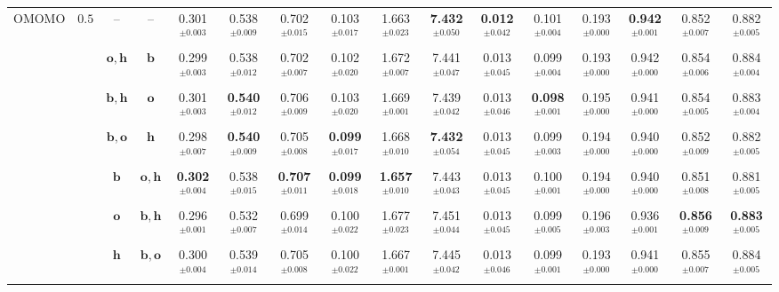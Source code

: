 \begin{table}
{\begin{tabular}{@{}cccccccccccccccc@{}}
        \multirow{7}{*}{OMOMO} & \multirow{7}{*}{$0.5$} & -- & -- &
        0.301$^{\pm0.003}$ & 0.538$^{\pm0.009}$ & 0.702$^{\pm0.015}$ & 0.103$^{\pm0.017}$ & 1.663$^{\pm0.023}$ & \textbf{7.432}$^{\pm0.050}$ & \textbf{0.012$^{\pm0.042}$} & 0.101$^{\pm0.004}$ & 0.193$^{\pm0.000}$ & \textbf{0.942$^{\pm0.001}$} & 0.852$^{\pm0.007}$ & 0.882$^{\pm0.005}$ \\
        & & $\boldsymbol{o}, \boldsymbol{h}$ & $\boldsymbol{b}$
        & 0.299$^{\pm0.003}$ & 0.538$^{\pm0.012}$ & 0.702$^{\pm0.007}$ & {0.102$^{\pm0.020}$} & 1.672$^{\pm0.007}$ & 7.441$^{\pm0.047}$ & 0.013$^{\pm0.045}$ & 0.099$^{\pm0.004}$ & 0.193$^{\pm0.000}$ & 0.942$^{\pm0.000}$ & 0.854$^{\pm0.006}$ & 0.884$^{\pm0.004}$ \\
        & & $\boldsymbol{b}, \boldsymbol{h}$ & $\boldsymbol{o}$
        & 0.301$^{\pm0.003}$ & \textbf{0.540$^{\pm0.012}$} & 0.706$^{\pm0.009}$ & 0.103$^{\pm0.020}$ & 1.669$^{\pm0.001}$ & 7.439$^{\pm0.042}$ & 0.013$^{\pm0.046}$ & \textbf{0.098$^{\pm0.001}$} & 0.195$^{\pm0.000}$ & 0.941$^{\pm0.000}$ & 0.854$^{\pm0.005}$ & 0.883$^{\pm0.004}$ \\
        & & $\boldsymbol{b}, \boldsymbol{o}$ & $\boldsymbol{h}$
        & 0.298$^{\pm0.007}$ & \textbf{0.540$^{\pm0.009}$} & 0.705$^{\pm0.008}$ & \textbf{0.099$^{\pm0.017}$} & 1.668$^{\pm0.010}$ & \textbf{7.432}$^{\pm0.054}$ & 0.013$^{\pm0.045}$ & 0.099$^{\pm0.003}$ & 0.194$^{\pm0.000}$ & 0.940$^{\pm0.000}$ & 0.852$^{\pm0.009}$ & 0.882$^{\pm0.005}$\\
        & & $\boldsymbol{b}$ & $\boldsymbol{o}, \boldsymbol{h}$
        & \textbf{0.302$^{\pm0.004}$} & 0.538$^{\pm0.015}$ & \textbf{0.707$^{\pm0.011}$} & \textbf{0.099$^{\pm0.018}$} & \textbf{1.657$^{\pm0.010}$} & 7.443$^{\pm0.043}$ & 0.013$^{\pm0.045}$ & 0.100$^{\pm0.001}$ & 0.194$^{\pm0.000}$ & 0.940$^{\pm0.000}$ & 0.851$^{\pm0.008}$ & 0.881$^{\pm0.005}$ \\
        & & $\boldsymbol{o}$ & $\boldsymbol{b}, \boldsymbol{h}$
        & 0.296$^{\pm0.001}$ & 0.532$^{\pm0.007}$ & 0.699$^{\pm0.014}$ & 0.100$^{\pm0.022}$ & 1.677$^{\pm0.023}$ & 7.451$^{\pm0.044}$ & 0.013$^{\pm0.045}$ & 0.099$^{\pm0.005}$ & {0.196$^{\pm0.003}$} & 0.936$^{\pm0.001}$ & \textbf{0.856$^{\pm0.009}$} & \textbf{0.883$^{\pm0.005}$} \\
        & & $\boldsymbol{h}$ & $\boldsymbol{b}, \boldsymbol{o}$
        & 0.300$^{\pm0.004}$ & 0.539$^{\pm0.014}$ & 0.705$^{\pm0.008}$ & 0.100$^{\pm0.022}$ & 1.667$^{\pm0.001}$ & 7.445$^{\pm0.042}$ & 0.013$^{\pm0.046}$ & 0.099$^{\pm0.001}$ & 0.193$^{\pm0.000}$ & 0.941$^{\pm0.000}$ & 0.855$^{\pm0.007}$ & 0.884$^{\pm0.005}$ \\
        \cmidrule(lr){2-16}


\end{tabular}}
\end{table}
